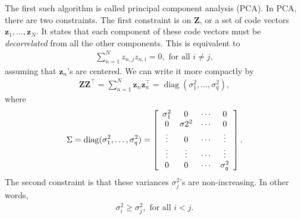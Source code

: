 \documentclass{report}
\newcommand{\vect}[1]{\mathbf{#1}}
\newcommand{\matr}[1]{\mathbf{#1}}
\newcommand{\diag}[0]{\operatorname{diag}}
\newcommand{\vz}[0]{\vect{z}}
\newcommand{\mZ}[0]{\matr{Z}}
\begin{document}
The first such algorithm is called principal component analysis (PCA). In PCA,
there are two constraints. The first constraint is on $\mZ$, or a set of code
vectors $\vz_1, \ldots, \vz_N$. It states that each component of these code
vectors must be {\it decorrelated} from all the other components. This is
equivalent to 
\begin{align*}
    \sum_{n=1}^N z_{n,j} z_{n,i} = 0,\text{ for all }i \neq j,
\end{align*}
assuming that $\vz_n$'s are centered. We can write it more compactly by
\begin{align*}
    \mZ \mZ^\top = \sum_{n=1}^N \vz_{n} \vz_n^\top = \diag(\sigma_1^2, \ldots, \sigma_q^2),
\end{align*}
where 
\begin{align*}
    \Sigma = \diag(\sigma_1^2, \ldots, \sigma_q^2) = 
    \left[
        \begin{array}{c c c c}
            \sigma_1^2 & 0 & \cdots & 0 \\
            0 & \sigma2^2 & \cdots & 0 \\
            \vdots & 0 & \cdots & \vdots \\
            \vdots & \vdots & \cdots & \vdots \\
            0 & 0 & \cdots & \sigma_q^2 
        \end{array}
    \right].
\end{align*}
The second constraint is that these variances $\sigma_j^2$'s are non-increasing.
In other words, 
\begin{align*}
    \sigma_i^2 \geq \sigma_j^2,\text{ for all }i < j.
\end{align*}
\end{document}
